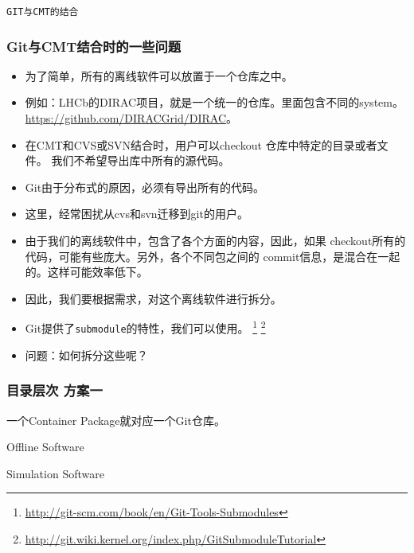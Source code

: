 \begin{frame}
    \begin{center}
        \LARGE \tt{GIT与CMT的结合}
    \end{center}
\end{frame}

\begin{frame}
    \frametitle{Git与CMT结合时的一些问题}
    \begin{itemize}    
        \item 为了简单，所有的离线软件可以放置于一个仓库之中。
        \item 例如：LHCb的DIRAC项目，就是一个统一的仓库。里面包含不同的system。
              \url{https://github.com/DIRACGrid/DIRAC}。
        \item 在CMT和CVS或SVN结合时，用户可以checkout
              仓库中特定的目录或者文件。 我们不希望导出库中所有的源代码。
        \item Git由于分布式的原因，必须有导出所有的代码。
        \item 这里，经常困扰从cvs和svn迁移到git的用户。
        \item 由于我们的离线软件中，包含了各个方面的内容，因此，如果
              checkout所有的代码，可能有些庞大。另外，各个不同包之间的
              commit信息，是混合在一起的。这样可能效率低下。
        \item 因此，我们要根据需求，对这个离线软件进行拆分。
        \item Git提供了{\tt submodule}的特性，我们可以使用。
              \footnote{\scriptsize\url{http://git-scm.com/book/en/Git-Tools-Submodules}}
              \footnote{\scriptsize\url{http://git.wiki.kernel.org/index.php/GitSubmoduleTutorial}}
        \item 问题：如何拆分这些呢？
    \end{itemize}
\end{frame}

\begin{frame}
    \frametitle{目录层次 方案一}
    一个Container Package就对应一个Git仓库。
    \renewcommand*\DTstylecomment{\rmfamily\color{red}\textsc}
    \begin{block}{Offline Software}
    \end{block}

    \begin{block}{Simulation Software}
    \end{block}
\end{frame}

